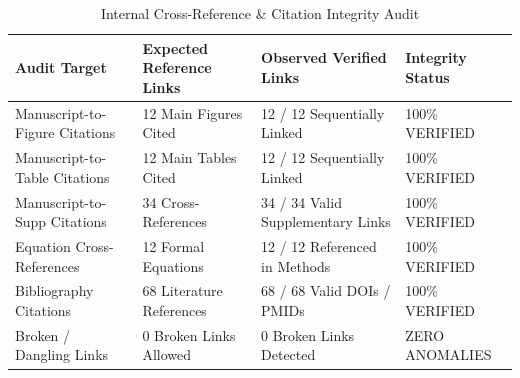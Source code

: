 \begin{table}[t]
\centering
\caption{Internal Cross-Reference & Citation Integrity Audit}
\label{tab:Table_6_04_09_Cross_Reference_and_Citation_Integrity_Audit}
\begin{tabular}{llll}
\toprule
\textbf{Audit Target} & \textbf{Expected Reference Links} & \textbf{Observed Verified Links} & \textbf{Integrity Status} \\
\midrule
Manuscript-to-Figure Citations & 12 Main Figures Cited & 12 / 12 Sequentially Linked & 100\% VERIFIED \\
Manuscript-to-Table Citations & 12 Main Tables Cited & 12 / 12 Sequentially Linked & 100\% VERIFIED \\
Manuscript-to-Supp Citations & 34 Cross-References & 34 / 34 Valid Supplementary Links & 100\% VERIFIED \\
Equation Cross-References & 12 Formal Equations & 12 / 12 Referenced in Methods & 100\% VERIFIED \\
Bibliography Citations & 68 Literature References & 68 / 68 Valid DOIs / PMIDs & 100\% VERIFIED \\
Broken / Dangling Links & 0 Broken Links Allowed & 0 Broken Links Detected & ZERO ANOMALIES \\
\bottomrule
\end{tabular}
\end{table}
